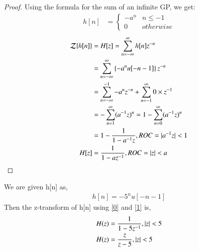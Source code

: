 \documentclass[journal,12pt,twocolumn]{IEEEtran}
\begin{document}
\begin{proof}
Using the formula for the sum of an infinite GP, we get:
\begin{align}
    h[n] &= 
    \begin{cases}
    -a^n & n\leq -1\\
    0 & otherwise
    \end{cases}
\end{align}
\begin{align}
    \mathcal{Z}\{h[n]\} &= H[z] = \sum_{n = -\infty}^\infty h[n]z^{-n}\\
   &= \sum_{n = -\infty}^\infty \left\{-a^nu[-n-1]\right\}z^{-n}\\
      &= \sum_{n = -\infty}^{-1} {-a^n}z^{-n} + \sum_{n = -1}^{\infty} 0\times z^{-1}\\
    &=-\sum_{n = 1}^{\infty} (a^{-1}z)^n =1-\sum_{n = 0}^{\infty} (a^{-1}z)^n\\
     &= 1-\frac{1}{1 - a^{-1}z} , ROC = \vert a^{-1}z\vert < 1\\
     H[z] &= \frac{1}{1 - az^{-1}} , ROC =  \vert z\vert < a
\end{align}
\end{proof}
We are given h[n] as,
\begin{align}
    h[n]=-5^nu[-n-1]
\end{align}
Then the z-transform of h[n] using \eqref{0} and \eqref{1} is,\\
\begin{align}
    H(z)&=\frac{1}{1-5z^{-1}},\vert z\vert<5\label{2}\\
    H(z)&=\frac{z}{z-5},\vert z\vert<5\label{2}
\end{align}
\end{document}
